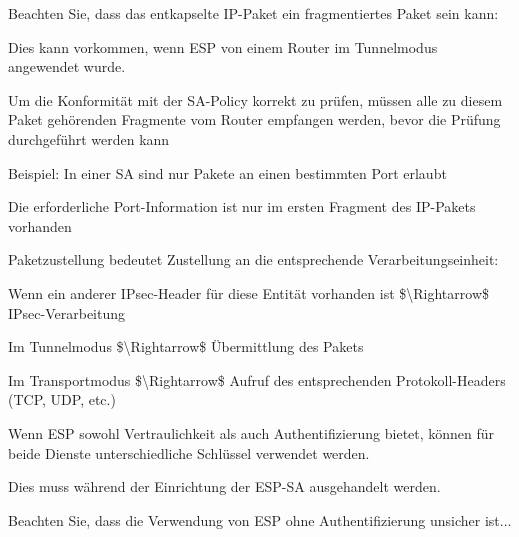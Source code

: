 \documentclass[a4paper]{article}
\begin{document}
\begin{multicols}{3}
\begin{itemize*}
            \item Beachten Sie, dass das entkapselte IP-Paket ein fragmentiertes Paket sein kann:
            \begin{itemize*}
                  \item Dies kann vorkommen, wenn ESP von einem Router im Tunnelmodus angewendet wurde.
                  \item Um die Konformität mit der SA-Policy korrekt zu prüfen, müssen alle zu diesem Paket gehörenden Fragmente vom Router empfangen werden, bevor die Prüfung durchgeführt werden kann
                  \item Beispiel: In einer SA sind nur Pakete an einen bestimmten Port erlaubt
                  \begin{itemize*}
                        \item Die erforderliche Port-Information ist nur im ersten Fragment des IP-Pakets vorhanden
                  \end{itemize*}
            \end{itemize*}
            \item Paketzustellung bedeutet Zustellung an die entsprechende Verarbeitungseinheit:
            \begin{itemize*}
                  \item Wenn ein anderer IPsec-Header für diese Entität vorhanden ist \$\textbackslash Rightarrow\$ IPsec-Verarbeitung
                  \item Im Tunnelmodus \$\textbackslash Rightarrow\$ Übermittlung des Pakets
                  \item Im Transportmodus \$\textbackslash Rightarrow\$ Aufruf des entsprechenden Protokoll-Headers (TCP, UDP, etc.)
            \end{itemize*}
            \item Wenn ESP sowohl Vertraulichkeit als auch Authentifizierung bietet, können für beide Dienste unterschiedliche Schlüssel verwendet werden.
            \begin{itemize*}
                  \item Dies muss während der Einrichtung der ESP-SA ausgehandelt werden.
            \end{itemize*}
            \item Beachten Sie, dass die Verwendung von ESP ohne Authentifizierung unsicher ist...

\end{itemize*}
\end{multicols}
\end{document}
